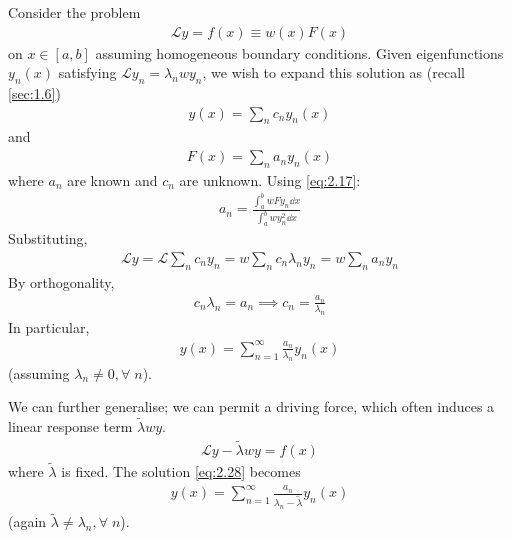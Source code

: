 Consider the problem
\begin{align} \label{eq:2.27}
    \mathcal L y = f(x) \equiv w(x) F(x)
\end{align}
on $x \in [a,b]$ assuming homogeneous boundary conditions.
Given eigenfunctions $y_n(x)$ satisfying $\mathcal L y_n = \lambda_n w y_n$, we wish to expand this solution as (recall \cref{sec:1.6})
\begin{align*}
    y(x) = \sum_n c_n y_n(x)
\end{align*}
and
\begin{align*}
    F(x) = \sum_n a_n y_n(x)
\end{align*}
where $a_n$ are known and $c_n$ are unknown.
Using \cref{eq:2.17}:
\begin{align*}
    a_n = \frac{\int_a^b w F y_n \dd{x}}{\int_a^b w y_n^2 \dd{x}}
\end{align*}
Substituting,
\begin{align*}
    \mathcal L y = \mathcal L \sum_n c_n y_n = w \sum_n c_n \lambda_n y_n = w \sum_n a_n y_n
\end{align*}
By orthogonality,
\begin{align*}
    c_n \lambda_n = a_n \implies c_n = \frac{a_n}{\lambda_n}
\end{align*}
In particular,
\begin{align} \label{eq:2.28}
    y(x) = \sum_{n=1}^\infty \frac{a_n}{\lambda_n}y_n(x)
\end{align} (assuming $\lambda_n \neq 0, \forall \; n$).

We can further generalise; we can permit a driving force, which often induces a linear response term $\widetilde\lambda w y$.
\begin{align} \label{eq:2.29}
    \mathcal L y - \widetilde \lambda w y = f(x)
\end{align}
where $\widetilde \lambda$ is fixed.
The solution \cref{eq:2.28} becomes
\begin{align} \label{eq:2.30}
    y(x) = \sum_{n=1}^\infty \frac{a_n}{\lambda_n - \widetilde \lambda} y_n(x)
\end{align} (again $\widetilde \lambda \neq \lambda_n, \forall \; n$).

